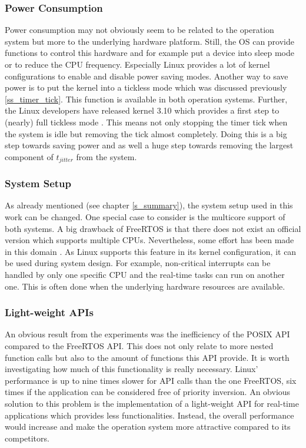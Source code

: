 \subsubsection{Power Consumption}
Power consumption may not obviously seem to be related to the operation system but more to the underlying hardware platform.
Still, the \ac{OS} can provide functions to control this hardware and for example put a device into sleep mode or to reduce the \ac{CPU} frequency.
Especially Linux provides a lot of kernel configurations to enable and disable power saving modes.
Another way to save power is to put the kernel into a tickless mode which was discussed previously \ref{ss_timer_tick}.
This function is available in both operation systems.
Further, the Linux developers have released kernel 3.10 which provides a first step to (nearly) full tickless mode \cite{corbet:nftoi}.
This means not only stopping the timer tick when the system is idle but removing the tick almost completely. 
Doing this is a big step towards saving power and as well a huge step towards removing the largest component of $t_{jitter}$ from the system.

\subsubsection{System Setup}
As already mentioned (see chapter \ref{s_summary}), the system setup used in this work can be changed.
One special case to consider is the multicore support of both systems.
A big drawback of FreeRTOS is that there does not exist an official version which supports multiple \acp{CPU}.
Nevertheless, some effort has been made in this domain \cite{mistry:affmaer}.
As Linux supports this feature in its kernel configuration, it can be used during system design.
For example, non-critical interrupts can be handled by only one specific \ac{CPU} and the real-time tasks can run on another one.
This is often done when the underlying hardware resources are available. 

\subsubsection{Light-weight APIs}
An obvious result from the experiments was the inefficiency of the POSIX \ac{API} compared to the FreeRTOS \ac{API}.
This does not only relate to more nested function calls but also to the amount of functions this \ac{API} provide.
It is worth investigating how much of this functionality is really necessary.
Linux' performance is up to nine times slower for \ac{API} calls than the one FreeRTOS, six times if the application can be considered free of priority inversion.
An obvious solution to this problem is the implementation of a light-weight \ac{API} for real-time applications which provides less functionalities.
Instead, the overall performance would increase and make the operation system more attractive compared to its competitors.



